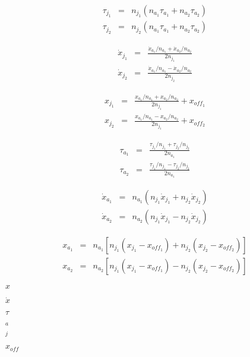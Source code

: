 \documentclass{article}
\begin{document}
\begin{eqnarray*} \tau_{j_1} & = & n_{j_1} ( n_{a_1} \tau_{a_1} + n_{a_2} \tau_{a_2} ) \\[2.5em] \tau_{j_2} & = & n_{j_2} ( n_{a_1} \tau_{a_1} + n_{a_2} \tau_{a_2} ) \end{eqnarray*}
\pagebreak

\begin{eqnarray*} \dot{x}_{j_1} & = & \frac{ \dot{x}_{a_1} / n_{a_1} + \dot{x}_{a_2} / n_{a_2} }{2 n_{j_1}} \\[1em] \dot{x}_{j_2} & = & \frac{ \dot{x}_{a_1} / n_{a_1} - \dot{x}_{a_2} / n_{a_2} }{2 n_{j_2}} \end{eqnarray*}
\pagebreak

\begin{eqnarray*} x_{j_1} & = & \frac{ x_{a_1} / n_{a_1} + x_{a_2} / n_{a_2} }{2 n_{j_1}} + x_{off_1} \\[1em] x_{j_2} & = & \frac{ x_{a_1} / n_{a_1} - x_{a_2} / n_{a_2} }{2 n_{j_1}} + x_{off_2} \end{eqnarray*}
\pagebreak

\begin{eqnarray*} \tau_{a_1} & = & \frac{ \tau_{j_1} / n_{j_1} + \tau_{j_2} / n_{j_2} }{2 n_{a_1}} \\[1em] \tau_{a_2} & = & \frac{ \tau_{j_1} / n_{j_1} - \tau_{j_2} / n_{j_2} }{2 n_{a_1}} \end{eqnarray*}
\pagebreak

\begin{eqnarray*} \dot{x}_{a_1} & = & n_{a_1} ( n_{j_1} \dot{x}_{j_1} + n_{j_2} \dot{x}_{j_2} ) \\[2.5em] \dot{x}_{a_2} & = & n_{a_2} ( n_{j_1} \dot{x}_{j_1} - n_{j_2} \dot{x}_{j_2} ) \end{eqnarray*}
\pagebreak

\begin{eqnarray*} x_{a_1} & = & n_{a_1} \left[ n_{j_1} (x_{j_1} - x_{off_1}) + n_{j_2} (x_{j_2} - x_{off_2}) \right] \\[2.5em] x_{a_2} & = & n_{a_2} \left[ n_{j_1} (x_{j_1} - x_{off_1}) - n_{j_2} (x_{j_2} - x_{off_2}) \right] \end{eqnarray*}
\pagebreak

$ x $
\pagebreak

$ \dot{x} $
\pagebreak

$ \tau $
\pagebreak

$ _a $
\pagebreak

$ _j $
\pagebreak

$ x_{off}$
\pagebreak
\end{document}
